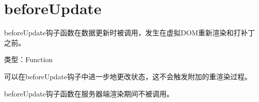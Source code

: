 \begin{lstlisting}[language=JavaScript]

\end{lstlisting}




\begin{lstlisting}[language=JavaScript]

\end{lstlisting}







\section{beforeUpdate}



beforeUpdate钩子函数在数据更新时被调用，发生在虚拟DOM重新渲染和打补丁之前。


\begin{compactitem}
\item 类型：Function
\end{compactitem}

可以在beforeUpdate钩子中进一步地更改状态，这不会触发附加的重渲染过程。


beforeUpdate钩子函数在服务器端渲染期间不被调用。


\begin{lstlisting}[language=JavaScript]

\end{lstlisting}




\begin{lstlisting}[language=JavaScript]

\end{lstlisting}




\begin{lstlisting}[language=JavaScript]

\end{lstlisting}




\begin{lstlisting}[language=JavaScript]

\end{lstlisting}




\begin{lstlisting}[language=JavaScript]

\end{lstlisting}




